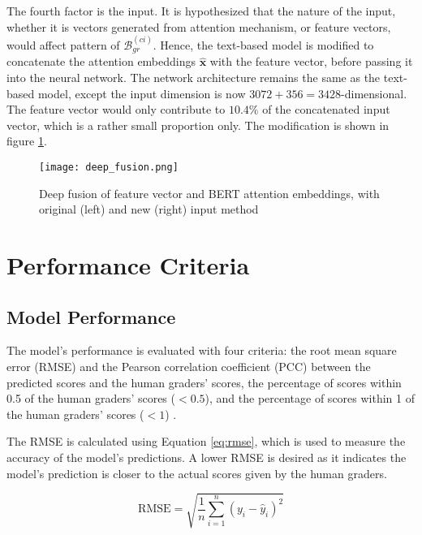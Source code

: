 The fourth factor is the input. It is hypothesized that the nature of the input, whether it is vectors generated from attention mechanism, or feature vectors, would affect pattern of $\mathcal{B}^{(ci)}_{gr}$. Hence, the text-based model is modified to concatenate the attention embeddings $\mathbf{\hat{x}}$ with the feature vector, before passing it into the neural network. The network architecture remains the same as the text-based model, except the input dimension is now $3072 + 356 = 3428$-dimensional. The feature vector would only contribute to $10.4\%$ of the concatenated input vector, which is a rather small proportion only. The modification is shown in figure \ref{fig:deep_fusion}.

\begin{figure}[H]
    \centering
    \texttt{[image: deep\_fusion.png]}
    \caption{Deep fusion of feature vector and BERT attention embeddings, with original (left) and new (right) input method}
    \label{fig:deep_fusion}
\end{figure}

\section{Performance Criteria} \label{sec:performance_criteria}
\subsection{Model Performance}
The model's performance is evaluated with four criteria: the root mean square error (RMSE) and the Pearson correlation coefficient (PCC)  between the predicted scores and the human graders' scores, the percentage of scores within 0.5 of the human graders' scores ($< 0.5$),   and the percentage of scores within 1 of the human graders' scores ($< 1$) .

The RMSE is calculated using Equation \ref{eq:rmse}, which is used to measure the accuracy of the model's predictions. A lower RMSE is desired as it indicates the model's prediction is closer to the actual scores given by the human graders.

\begin{equation} \label{eq:rmse}
    \text{RMSE} = \sqrt{\frac{1}{n} \sum_{i=1}^{n} (y_i - \hat{y}_i)^2}
\end{equation}

